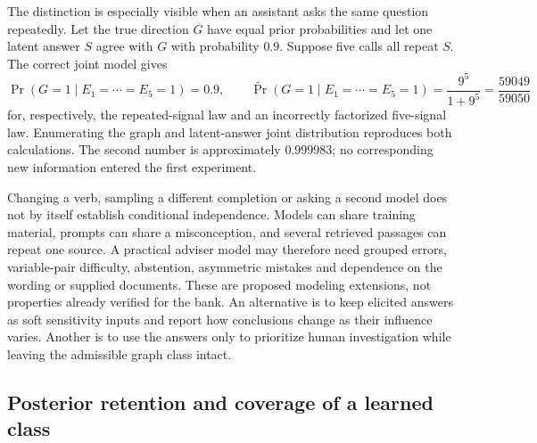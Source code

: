 The distinction is especially visible when an assistant asks the same question
repeatedly. Let the true direction $G$ have equal prior probabilities and let
one latent answer $S$ agree with $G$ with probability $0.9$. Suppose five calls
all repeat $S$. The correct joint model gives
\begin{equation}
 \Pr(G=1\mid E_1=\cdots=E_5=1)=0.9,
 \qquad
 \widetilde\Pr(G=1\mid E_1=\cdots=E_5=1)
        =\frac{9^5}{1+9^5}=\frac{59049}{59050}
\label{exec17:advice-repetition}
\end{equation}
for, respectively, the repeated-signal law and an incorrectly factorized
five-signal law. Enumerating the graph and latent-answer joint distribution
reproduces both calculations. The second number is approximately $0.999983$;
no corresponding new information entered the first experiment.
\citep{exec17_advice_validity_exact}

Changing a verb, sampling a different completion or asking a second model does
not by itself establish conditional independence. Models can share training
material, prompts can share a misconception, and several retrieved passages
can repeat one source. A practical adviser model may therefore need grouped
errors, variable-pair difficulty, abstention, asymmetric mistakes and dependence
on the wording or supplied documents. These are proposed modeling extensions,
not properties already verified for the bank. An alternative is to keep
elicited answers as soft sensitivity inputs and report how conclusions change
as their influence varies. Another is to use the answers only to prioritize
human investigation while leaving the admissible graph class intact.

\subsection{Posterior retention and coverage of a learned class}

